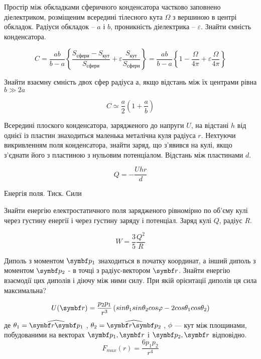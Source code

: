 \documentclass[]{ProblemBook}
\begin{document}
\begin{problem}
    Простір між обкладками сферичного конденсатора частково заповнено діелектриком, розміщеним всередині тілесного кута $\Omega$ з вершиною в центрі обкладок. Радіуси обкладок – $a$ і $b$, проникність діелектрика – $\varepsilon$. Знайти ємність конденсатора.
	\begin{solution}
\[C=\frac{ab}{b-a}\left\lbrace \frac{S_{\text{сфери}}-S_{\text{кут}}}{S_{\text{сфери}}}+\varepsilon\frac{S_{\text{кут}}}{S_{\text{сфери}}}\right\rbrace =\frac{ab}{b-a}\left\{1-\frac{\Omega}{4\pi}+\varepsilon\frac{\Omega}{4\pi}\right\}\]
\end{solution}
\end{problem}

\begin{problem}
    Знайти взаємну ємність двох сфер радіуса а, якщо відстань між їх центрами рівна $b \gg 2a$
	\begin{solution}
\[C\simeq\frac{a}{2}\left(1+\frac{a}{b}\right)\]
\end{solution}
\end{problem}

\begin{problem}
   Всередині плоского конденсатора, зарядженого до напруги $U$, на відстані $h$ від однієї із пластин знаходиться маленька металічна куля радіуса $r$. Нехтуючи викривленням поля конденсатора, знайти заряд, що з’явився на кулі, якщо з’єднати його з пластиною з нульовим потенціалом. Відстань між пластинами $d$. 
	\begin{solution}
\[Q =  - \frac{Uhr}{d}\]
\end{solution}
\end{problem}

Енергія поля. Тиск. Сили

\begin{problem}
  Знайти енергію електростатичного поля зарядженого рівномірно по об’єму кулі через густину енергії і через густину заряду і потенціал. Заряд кулі $Q$, радіус $R$.
	\begin{solution}
\[W = \frac{3}{5}\frac{Q^2}{R}\]
\end{solution}
\end{problem}

\begin{problem}
   Диполь з моментом $\vect{p_1}$ знаходиться в початку координат, а інший диполь з моментом $\vect{p_2}$ - в точці з радіус-вектором $\vect{r}$. Знайти енергію взаємодії цих диполів і діючу між ними силу. При якій орієнтації диполів ця сила максимальна?
	\begin{solution}
\[U(\vect{r})=\frac{p_2p_1}{r^3}\left(sin\theta_1 sin\theta_2 cos\phi-2cos\theta_1 cos\theta_2\right)\]
де $\theta_1 = \widehat {\vect{r}\vect{p_1}}$ , $\theta_2 = \widehat {\vect{r}\vect{p_2}}$ , $\phi$ --- кут між площинами, побудованими на векторах  $\vect{p_1},\vect{r}$ і $\vect{p_2},\vect{r}$ відповідно.
\[F_{max}(r)=\frac{6p_1p_2}{r^4}\]
\end{solution}
\end{problem}
\end{document}
